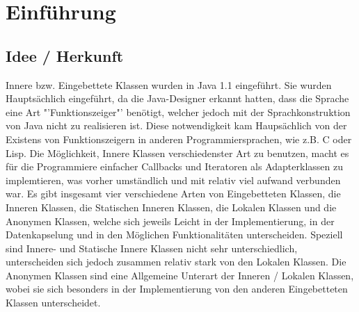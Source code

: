 \chapter{Einführung}
\section{Idee / Herkunft}

Innere bzw. Eingebettete Klassen wurden in Java 1.1 eingeführt. \cite{Oracle:JDK_Doku1.1.4}
Sie wurden Hauptsächlich eingeführt, da die Java-Designer erkannt hatten, dass die Sprache eine Art "'Funktionszeiger"' benötigt, welcher jedoch mit der Sprachkonstruktion von Java nicht zu realisieren ist.
Diese notwendigkeit kam Haupsächlich von der Existens von Funktionszeigern in anderen Programmiersprachen, wie z.B. C oder Lisp.
Die Möglichkeit, Innere Klassen verschiedenster Art zu benutzen, macht es für die Programmiere einfacher Callbacks und Iteratoren als Adapterklassen zu implemtieren, was vorher umständlich und mit relativ viel aufwand verbunden war.
Es gibt insgesamt vier verschiedene Arten von Eingebetteten Klassen, die Inneren Klassen, die Statischen Inneren Klassen, die Lokalen Klassen und die Anonymen Klassen, welche sich jeweils Leicht in der Implementierung, in der Datenkapselung und in den Möglichen Funktionalitäten unterscheiden.
Speziell sind Innere- und Statische Innere Klassen nicht sehr unterschiedlich, unterscheiden sich jedoch zusammen relativ stark von den Lokalen Klassen.
Die Anonymen Klassen sind eine Allgemeine Unterart der Inneren / Lokalen Klassen, wobei sie sich besonders in der Implementierung von den anderen Eingebetteten Klassen unterscheidet.

\newpage
